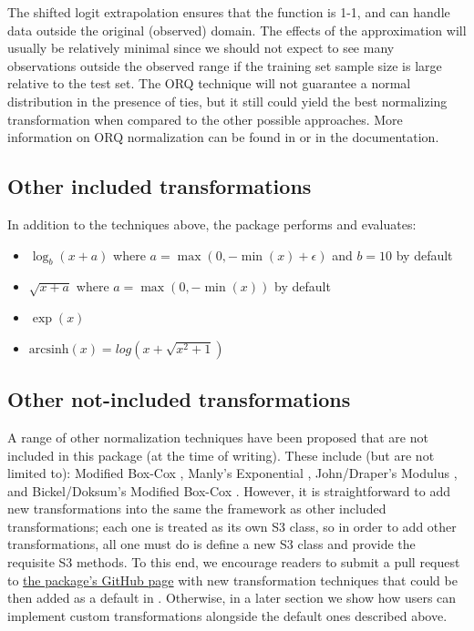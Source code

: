 The shifted logit extrapolation ensures that the function is 1-1, and
can handle data outside the original (observed) domain. The effects of
the approximation will usually be relatively minimal since we should not
expect to see many observations outside the observed range if the
training set sample size is large relative to the test set. The ORQ
technique will not guarantee a normal distribution in the presence of
ties, but it still could yield the best normalizing transformation when
compared to the other possible approaches. More information on ORQ
normalization can be found in \citet{orq_paper} or in the
 documentation.

\hypertarget{other-included-transformations}{%
\subsection{Other included
transformations}\label{other-included-transformations}}

In addition to the techniques above, the  package
performs and evaluates:

\begin{itemize}
\tightlist
\item
  \(\log_b(x + a)\) where \(a = \max(0, -\min(x) + \epsilon)\) and
  \(b = 10\) by default
\item
  \(\sqrt{x + a}\) where \(a = \max(0, -\min(x))\) by default
\item
  \(\exp(x)\)
\item
  \(\text {arcsinh}(x) = log(x + \sqrt{x^2 + 1})\)
\end{itemize}

\hypertarget{other-not-included-transformations}{%
\subsection{Other not-included
transformations}\label{other-not-included-transformations}}

A range of other normalization techniques have been proposed that are
not included in this package (at the time of writing). These include
(but are not limited to): Modified Box-Cox \citep{BoxCox1964}, Manly's
Exponential \citep{Manly}, John/Draper's Modulus \citep{JohnDraper}, and
Bickel/Doksum's Modified Box-Cox \citep{BickelDoksum}. However, it is
straightforward to add new transformations into the same the framework
as other included transformations; each one is treated as its own S3
class, so in order to add other transformations, all one must do is
define a new S3 class and provide the requisite S3 methods. To this end,
we encourage readers to submit a pull request to
\href{https://github.com/petersonR/bestNormalize}{the package's GitHub
page} with new transformation techniques that could be then added as a
default in . Otherwise, in a later section we show
how users can implement custom transformations alongside the default
ones described above.

